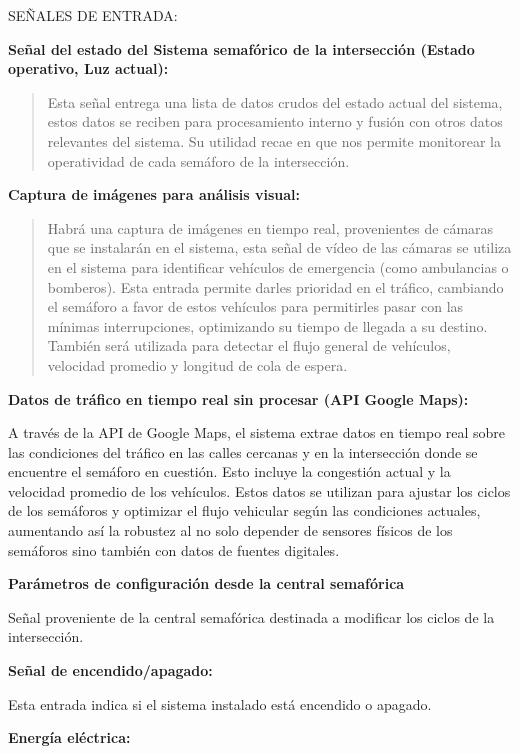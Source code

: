 \documentclass[12pt,a4paper,oneside]{report}
\begin{document}
SEÑALES DE ENTRADA:

\textbf{Señal del estado del Sistema semafórico de la intersección (Estado operativo, Luz actual):}

\begin{quote}
Esta señal entrega una lista de datos crudos del estado actual del sistema, estos datos se reciben para procesamiento interno y fusión con otros datos relevantes del sistema. Su utilidad recae en que nos permite monitorear la operatividad de cada semáforo de la intersección.
\end{quote}

\textbf{Captura de imágenes para análisis visual:}

\begin{quote}
Habrá una captura de imágenes en tiempo real, provenientes de cámaras que se instalarán en el sistema, esta señal de vídeo de las cámaras se utiliza en el sistema para identificar vehículos de emergencia (como ambulancias o bomberos). Esta entrada permite darles prioridad en el tráfico, cambiando el semáforo a favor de estos vehículos para permitirles pasar con las mínimas interrupciones, optimizando su tiempo de llegada a su destino. También será utilizada para detectar el flujo general de vehículos, velocidad promedio y longitud de cola de espera.
\end{quote}

\textbf{Datos de tráfico en tiempo real sin procesar  (API Google Maps):}

A través de la API de Google Maps, el sistema extrae datos en tiempo real sobre las condiciones del tráfico en las calles cercanas y en la intersección donde se encuentre el semáforo en cuestión. Esto incluye la congestión actual y la velocidad promedio de los vehículos. Estos datos se utilizan para ajustar los ciclos de los semáforos y optimizar el flujo vehicular según las condiciones actuales, aumentando así la robustez al no solo depender de sensores físicos de los semáforos sino también con datos de fuentes digitales.

\textbf{Parámetros de configuración desde la central semafórica}

Señal proveniente de la central semafórica destinada a modificar los ciclos de la intersección.

\textbf{Señal de encendido/apagado:}

Esta entrada indica si el sistema instalado está encendido o apagado.

\textbf{Energía eléctrica:}
\end{document}
